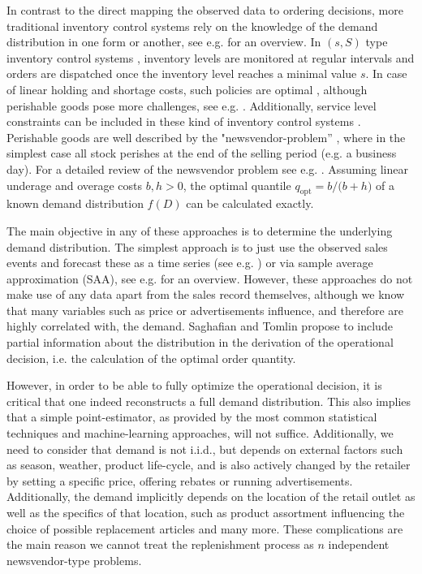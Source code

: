 \documentclass[BCOR=1mm, DIV=calc,10pt,
twoside=true,
twocolumn,
headings=normal]{scrartcl}
\begin{document}
In contrast to the direct mapping the observed data to ordering decisions, more traditional inventory control systems rely on the knowledge of the demand distribution in one form or another, see e.g. \cite{silver1998} for an overview. In $(s,S)$ type inventory control systems \cite{Scarf1958}, inventory levels are monitored at regular intervals and orders are dispatched once the inventory level reaches a minimal value $s$. In case of linear holding and shortage costs, such policies are optimal \cite{Scarf1959}, although perishable goods pose more challenges, see e.g. \cite{Nahmias1973,Nahmias1975,nahmias1978}. Additionally, service level constraints can be included in these kind of inventory control systems \cite{minner2010periodic}. Perishable goods are well described by the "newsvendor-problem'' \cite{Edgeworth}, where in the simplest case all stock perishes at the end of the selling period (e.g. a business day). For a detailed review of the newsvendor problem see e.g. \cite{Khouja1999537}. Assuming linear underage and overage costs $b,h >0$, the optimal quantile $q_{\mathrm{opt}} = {b}/{(b+h})$ of a known demand distribution $f(D)$ can be calculated exactly. 

The main objective in any of these approaches is to determine the underlying demand distribution. The simplest approach is to just use the observed sales events and forecast these as a time series (see e.g. \cite{alwan2016}) or via sample average approximation (SAA), see e.g. \cite{shapiro2014} for an overview. However, these approaches do not make use of any data apart from the sales record themselves, although we know that many variables such as price or advertisements influence, and therefore are highly correlated with, the demand. Saghafian and Tomlin \cite{saghafian2016newsvendor} propose to include partial information about the distribution in the derivation of the operational decision, i.e. the  calculation of the optimal order quantity.

However, in order to be able to fully optimize the operational decision, it is critical that one indeed reconstructs a full demand distribution. This also implies that a simple point-estimator, as provided by the most common statistical techniques and machine-learning approaches, will not suffice. Additionally, we need to consider that demand is not i.i.d., but depends on external factors such as season, weather, product life-cycle, and is also actively changed by the retailer by setting a specific price, offering rebates or running advertisements. Additionally, the demand implicitly depends on the location of the retail outlet as well as the specifics of that location, such as product  assortment influencing the choice of possible replacement articles and many more. These complications are the main reason we cannot treat the replenishment process as $n$ independent newsvendor-type problems.
\end{document}
